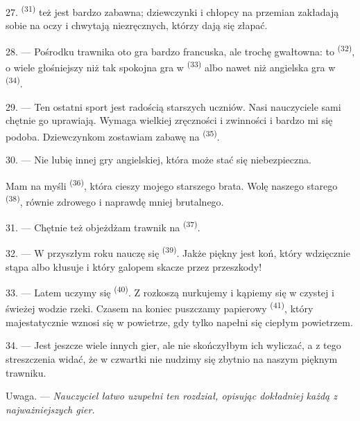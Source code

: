 27. \textsuperscript{(31)} też jest bardzo zabawna; dziewczynki i
chłopcy na przemian zakładają sobie  na oczy i chwytają niezręcznych,
którzy dają się złapać.

28. --- Pośrodku trawnika oto gra bardzo francuska, ale trochę gwałtowna: to
\textsuperscript{(32)}, o wiele głośniejszy niż tak spokojna gra w
\textsuperscript{(33)} albo nawet niż angielska gra w
\textsuperscript{(34)}.

29. --- Ten ostatni sport jest radością starszych uczniów. Nasi nauczyciele sami chętnie
go uprawiają. Wymaga wielkiej zręczności i zwinności i bardzo mi się podoba.
Dziewczynkom zostawiam zabawę na \textsuperscript{(35)}.

30. --- Nie lubię innej gry angielskiej, która może stać się niebezpieczna.

Mam na myśli \textsuperscript{(36)}, która cieszy mojego starszego
brata. Wolę naszego starego \textsuperscript{(38)}, równie zdrowego i
naprawdę mniej brutalnego.

\VUsaut{4.6mm}
\VUsaut{3.0mm}

31. --- Chętnie też objeżdżam trawnik na \textsuperscript{(37)}.

32. --- W przyszłym roku nauczę się \textsuperscript{(39)}. Jakże
piękny jest koń, który wdzięcznie stąpa albo kłusuje i który galopem skacze przez
przeszkody!

33. --- Latem uczymy się \textsuperscript{(40)}. Z rozkoszą nurkujemy
i kąpiemy się w czystej i świeżej wodzie rzeki. Czasem na koniec puszczamy papierowy
\textsuperscript{(41)}, który majestatycznie wznosi się w powietrze,
gdy tylko napełni się ciepłym powietrzem.

34. --- Jest jeszcze wiele innych gier, ale nie skończyłbym ich wyliczać, a z tego
streszczenia widać, że w czwartki nie nudzimy się zbytnio na naszym pięknym trawniku.

Uwaga. --- \textit{Nauczyciel łatwo uzupełni ten rozdział, opisując dokładniej każdą z
najważniejszych gier.}
